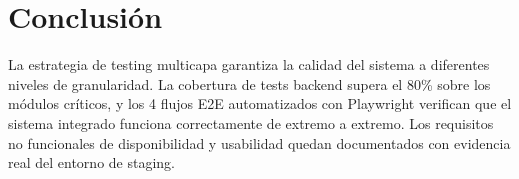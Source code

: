 \section{Conclusi\'on}\label{sec:conclusion-pruebas}

La estrategia de testing multicapa garantiza la calidad del sistema a diferentes niveles de
granularidad. La cobertura de tests backend supera el 80\% sobre los m\'odulos cr\'iticos, y los
4 flujos E2E automatizados con Playwright verifican que el sistema integrado funciona correctamente
de extremo a extremo. Los requisitos no funcionales de disponibilidad y usabilidad quedan
documentados con evidencia real del entorno de staging.
